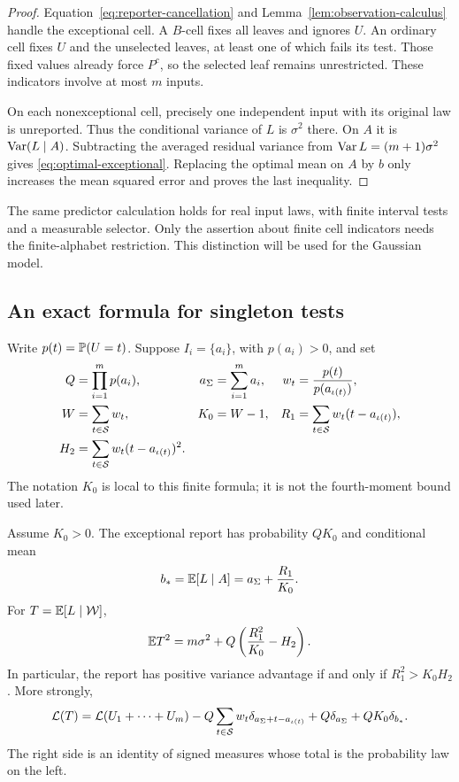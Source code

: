 \begin{proof}
Equation~\eqref{eq:reporter-cancellation} and
Lemma~\ref{lem:observation-calculus} handle the exceptional cell.
A \(B\)-cell fixes all leaves and ignores \(U\). An ordinary cell fixes
\(U\) and the unselected leaves, at least one of which fails its test.
Those fixed values already force \(P^c\), so the selected leaf remains
unrestricted. These indicators involve at most \(m\) inputs.

On each nonexceptional cell, precisely one independent input with its
original law is unreported. Thus the conditional variance of \(L\) is
\(\sigma^2\) there. On \(A\) it is \(\operatorname{Var}(L\mid A)\).
Subtracting the averaged residual variance from
\(\operatorname{Var} L=(m+1)\sigma^2\) gives
\eqref{eq:optimal-exceptional}. Replacing the optimal mean on \(A\)
by \(b\) only increases the mean squared error and proves the last
inequality.
\end{proof}

The same predictor calculation holds for real input laws, with finite
interval tests and a measurable selector. Only the assertion about
finite cell indicators needs the finite-alphabet restriction. This
distinction will be used for the Gaussian model.

\subsection{An exact formula for singleton tests}

Write \(p(t)=\mathbb P(U=t)\). Suppose \(I_i=\{a_i\}\), with
\(p(a_i)>0\), and set
\begin{align}
 Q&=\prod_{i=1}^m p(a_i),&
 a_\Sigma&=\sum_{i=1}^m a_i,&
 w_t&=\frac{p(t)}{p(a_{\iota(t)})},\notag\\
 W&=\sum_{t\in\mathcal S}w_t,&
 K_0&=W-1,&
 R_1&=\sum_{t\in\mathcal S}w_t(t-a_{\iota(t)}),\notag\\
 H_2&=\sum_{t\in\mathcal S}w_t(t-a_{\iota(t)})^2.&&&
 \label{eq:singleton-parameters}
\end{align}
The notation \(K_0\) is local to this finite formula; it is not the
fourth-moment bound used later.

\begin{theorem}
\label{thm:finite-selector}
Assume \(K_0>0\). The exceptional report has probability \(QK_0\) and
conditional mean
\[
 b_*=\mathbb E[L\mid A]=a_\Sigma+\frac{R_1}{K_0}.
\]
For \(T=\mathbb E[L\mid\mathcal W]\),
\begin{equation}\label{eq:finite-retention}
 \mathbb E T^2=m\sigma^2+
 Q\left(\frac{R_1^2}{K_0}-H_2\right).
\end{equation}
In particular, the report has positive variance advantage if and only
if \(R_1^2>K_0H_2\). More strongly,
\begin{equation}\label{eq:finite-score-law}
 \mathcal L(T)=\mathcal L(U_1+\cdots+U_m)
 -Q\sum_{t\in\mathcal S}w_t\delta_{a_\Sigma+t-a_{\iota(t)}}
 +Q\delta_{a_\Sigma}+QK_0\delta_{b_*}.
\end{equation}
The right side is an identity of signed measures whose total is the
probability law on the left.
\end{theorem}

